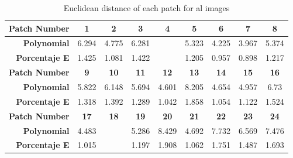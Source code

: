 \begin{table}[H]
  \caption{Euclidean distance of each patch for al images }
  \begin{center}
    \begin{tabularx}{\textwidth}{r c c c c c c c c}
    \toprule
        \textbf{Patch Number} & \textbf{1} & \textbf{2} & \textbf{3} & \textbf{4} & \textbf{5} & \textbf{6} & \textbf{7} & \textbf{8}\\ \midrule 
        \textbf{Polynomial} &6.294 &4.775 &6.281 &\cellcolor{colorred}{8.522} &5.323 &4.225 &3.967 &5.374\\ 
        \textbf{Porcentaje E} &1.425 &1.081 &1.422 &\cellcolor{colorred}{1.929} &1.205 &0.957 &0.898 &1.217\\ \midrule 
        \textbf{Patch Number} & \textbf{9} & \textbf{10} & \textbf{11} & \textbf{12} & \textbf{13} & \textbf{14} & \textbf{15} & \textbf{16}\\ \midrule 
        \textbf{Polynomial} &5.822 &6.148 &5.694 &4.601 &8.205 &4.654 &4.957 &6.73\\ 
        \textbf{Porcentaje E} &1.318 &1.392 &1.289 &1.042 &1.858 &1.054 &1.122 &1.524\\ \midrule 
        \textbf{Patch Number} & \textbf{17} & \textbf{18} & \textbf{19} & \textbf{20} & \textbf{21} & \textbf{22} & \textbf{23} & \textbf{24}\\ \midrule 
        \textbf{Polynomial} &4.483 &\cellcolor{colorgreen}{3.894} &5.286 &8.429 &4.692 &7.732 &6.569 &7.476\\ 
        \textbf{Porcentaje E} &1.015 &\cellcolor{colorgreen}{0.882} &1.197 &1.908 &1.062 &1.751 &1.487 &1.693\\ \midrule 
    \bottomrule
    \end{tabularx}
  \end{center}
\end{table}
